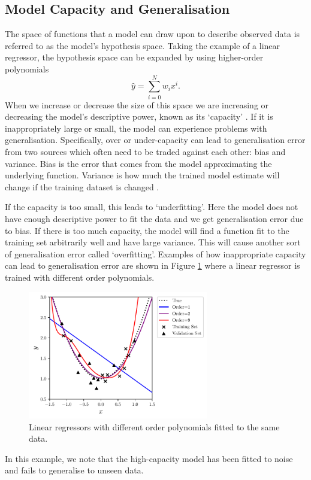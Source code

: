 \subsection{Model Capacity and Generalisation}
The space of functions that a model can draw upon to describe observed data is referred to as the model's hypothesis space.
Taking the example of a linear regressor, the hypothesis space can be expanded by using higher-order polynomials
\begin{equation}
    \hat{y} = \sum_{i=0}^{N}w_{i}x^{i}.
\end{equation}
When we increase or decrease the size of this space we are increasing or decreasing the model's descriptive power, known as its `capacity' \cite{DeepLearningBook}. If it is inappropriately large or small, the model can experience problems with generalisation.
Specifically, over or under-capacity can lead to generalisation error from two sources which often need to be traded against each other: bias and variance. Bias is the error that comes from the model approximating the underlying function. Variance is how much the trained model estimate will change if the training dataset is changed \cite{DeepLearningBook}. 

If the capacity is too small, this leads to `underfitting'. Here the model does not have enough descriptive power to fit the data and we get generalisation error due to bias. If there is too much capacity, the model will find a function fit to the training set arbitrarily well and have large variance. This will cause another sort of generalisation error called `overfitting'. Examples of how inappropriate capacity can lead to generalisation error are shown in Figure \ref{fig:machine_learning:overfitting} where a linear regressor is trained with different order polynomials. 
\begin{figure}[h!]
    \centering
        \includegraphics[width=0.7\textwidth]{figures/machine_learning/capacity.pdf}
    \caption{Linear regressors with different order polynomials fitted to the same data. }
        \label{fig:machine_learning:overfitting}
\end{figure}
In this example, we note that the high-capacity model has been fitted to noise and fails to generalise to unseen data. 

